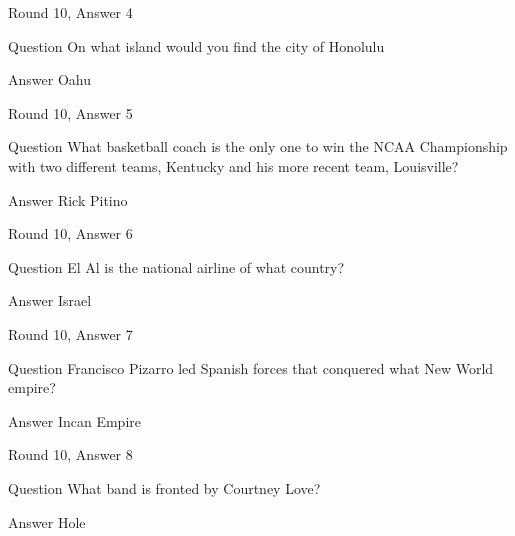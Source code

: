 \documentclass[11pt]{beamer}
\begin{document}
\begin{frame}[t]{Round 10, Answer 4}
\vspace{2em}
\begin{block}{Question}
On what island would you find the city of Honolulu
\end{block}
\pause{}
\begin{block}{Answer}
Oahu
\end{block}
\end{frame}
    

\begin{frame}[t]{Round 10, Answer 5}
\vspace{2em}
\begin{block}{Question}
What basketball coach is the only one to win the NCAA Championship with two different teams, Kentucky and his more recent team, Louisville\@?
\end{block}
\pause{}
\begin{block}{Answer}
Rick Pitino
\end{block}
\end{frame}
    

\begin{frame}[t]{Round 10, Answer 6}
\vspace{2em}
\begin{block}{Question}
El Al is the national airline of what country\@?
\end{block}
\pause{}
\begin{block}{Answer}
Israel
\end{block}
\end{frame}
    

\begin{frame}[t]{Round 10, Answer 7}
\vspace{2em}
\begin{block}{Question}
Francisco Pizarro led Spanish forces that conquered what New World empire\@?
\end{block}
\pause{}
\begin{block}{Answer}
Incan Empire
\end{block}
\end{frame}
    

\begin{frame}[t]{Round 10, Answer 8}
\vspace{2em}
\begin{block}{Question}
What band is fronted by Courtney Love\@?
\end{block}
\pause{}
\begin{block}{Answer}
Hole
\end{block}
\end{frame}
    
\end{document}
